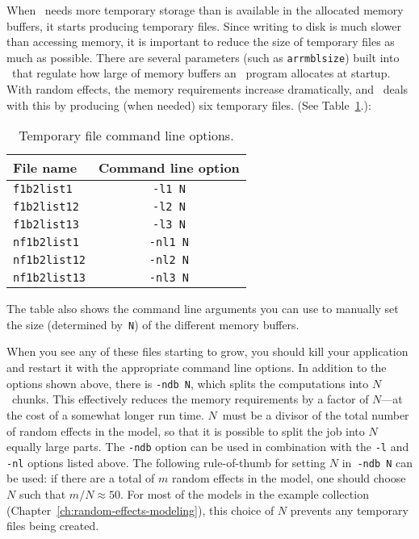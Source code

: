 \documentclass{admbmanual}
\begin{document}
When \scAB\ needs more temporary storage than is available in the allocated
memory buffers, it starts producing temporary files. Since writing to disk is
much slower than accessing memory, it is important to reduce the size of
temporary files as much as possible. There are several parameters (such as
\texttt{arrmblsize}) built into \scAB\ that regulate how large of memory buffers
an \scAB\ program allocates at startup. With random effects, the memory
requirements increase dramatically, and \scAR\ deals with this by producing
(when needed) six temporary files. (See Table~\ref{tab:temporary-files}.):
\begin{table}[htbp]
  \begin{center}
    \begin{tabular}{@{\vrule height 12pt depth 6pt width0pt} lc}
      \hline
      \textbf{File name}   & \textbf{Command line option}\\
      \hline
      \texttt{f1b2list1}   & \texttt{-l1 N}              \\
      \texttt{f1b2list12}  & \texttt{-l2 N}              \\
      \texttt{f1b2list13}  & \texttt{-l3 N}              \\
      \texttt{nf1b2list1}  & \texttt{-nl1 N}             \\
      \texttt{nf1b2list12} & \texttt{-nl2 N}             \\
      \texttt{nf1b2list13} & \texttt{-nl3 N}             \\
      \hline
    \end{tabular}
  \end{center}
  \caption{Temporary file command line options.}
  \label{tab:temporary-files}
\end{table}
The table also shows the command line arguments you can use to manually set the
size (determined by~\texttt{N}) of the different memory buffers.

When you see any of these files starting to grow, you should kill your
application and restart it with the appropriate command line options. In
addition to the options shown above, there is \texttt{-ndb N}, which splits the
computations into $N$~chunks. This effectively reduces the memory requirements
by a factor of $N$---at the cost of a somewhat longer run time. $N$~must be a
divisor of the total number of random effects in the model, so that it is
possible to split the job into $N$ equally large parts. The \texttt{-ndb} option
can be used in combination with the \texttt{-l} and \texttt{-nl} options listed
above. The following rule-of-thumb for setting $N$ in~\texttt{-ndb N} can be
used: if there are a total of $m$ random effects in the model, one should
choose $N$ such that $m/N\approx 50$. For most of the models in the example
collection (Chapter~\ref{ch:random-effects-modeling}),%
this choice of $N$ prevents any temporary files being created.
\end{document}
